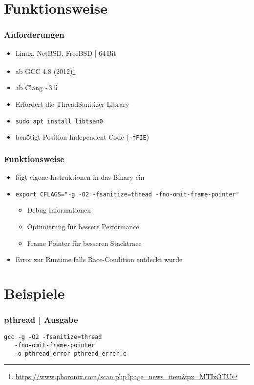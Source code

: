 \documentclass[xcolor=dvipsnames,hyperref={pdfpagelabels=false}]{beamer}
\begin{document}
\section{Funktionsweise} 
\begin{frame}
	\frametitle{Anforderungen}
	\begin{itemize}
		\item Linux, NetBSD, FreeBSD | 64\,Bit\pause 
		\item ab GCC 4.8 (2012)\footnote{\tiny{\url{https://www.phoronix.com/scan.php?page=news_item&px=MTIzOTU}}}
		\item ab Clang \~{}3.5\pause 
		\item Erfordert die ThreadSanitizer Library
		\item \texttt{sudo apt install libtsan0}
		\item benötigt Position Independent Code (\texttt{-fPIE})
	\end{itemize} 
\end{frame}

\begin{frame}
\frametitle{Funktionsweise}
	\begin{itemize}
		\item fügt eigene Instruktionen in das Binary ein\medskip\pause 
		\item \texttt{export CFLAGS="{}-g -O2 -fsanitize=thread -fno-omit-frame-pointer"}
			\begin{itemize}
				\item Debug Informationen
				\item Optimierung für bessere Performance
				\item Frame Pointer für besseren Stacktrace
			\end{itemize}\medskip\pause 
		\item Error zur Runtime falls Race-Condition entdeckt wurde
	\end{itemize}
\end{frame}

\section{Beispiele} 
\begin{frame}[fragile]
	\frametitle{pthread | Ausgabe}
	
	\smallskip
	\texttt{gcc  -g  -O2  -fsanitize=thread}\\
		\texttt{~~~-fno-omit-frame-pointer}\\
		\texttt{~~~-o pthread\_error  pthread\_error.c}
	\vspace*{1cm}
\end{frame}
\end{document}
